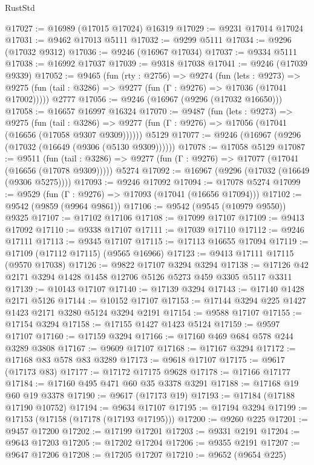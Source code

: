 \begin{lexlean}{RustStd}
\begin{coremodule}
{\begin{coremodule}
{{{{{{{{{{{{{{{{{{{{{{{{{{{{{{{{{@17027 := @16989 (@17015 @17024) @16319
@17029 := @9231 @17014 @17024
@17031 := @9462 @17013 @5111
@17032 := @9299 @5111
@17034 := @9296 (@17032 @9312)
@17036 := @9246 (@16967 @17034)
@17037 := @9334 @5111
@17038 := @16992 @17037
@17039 := @9318 @17038
@17041 := @9246 (@17039 @9339)
@17052 := @9465
    (fun (rty : @2756) =>
    @9274
      (fun (lets : @9273) =>
      @9275 (fun (tail : @3286) => @9277 (fun (Γ : @9276) => @17036 (@17041 @17002)))))
    @2777
@17056 := @9246 (@16967 (@9296 (@17032 @16650)))
@17058 := @16657 @16997 @16324
@17070 := @9487
    (fun (lets : @9273) =>
    @9275
      (fun (tail : @3286) =>
      @9277 (fun (Γ : @9276) => @17056 (@17041 (@16656 (@17058 @9307 @9309))))))
    @5129
@17077 := @9246 (@16967 (@9296 (@17032 (@16649 (@9306 (@5130 @9309))))))
@17078 := @17058 @5129
@17087 := @9511
    (fun (tail : @3286) => @9277 (fun (Γ : @9276) => @17077 (@17041 (@16656 (@17078 @9309)))))
    @5274
@17092 := @16967 (@9296 (@17032 (@16649 (@9306 @5275))))
@17093 := @9246 @17092
@17094 := @17078 @5274
@17099 := @9529 (fun (Γ : @9276) => @17093 (@17041 (@16656 @17094)))
@17102 := @9542 (@9859 (@9964 @9861))
@17106 := @9542 (@9545 (@10979 @9550)) @9325
@17107 := @17102 @17106
@17108 := @17099 @17107
@17109 := @9413 @17092
@17110 := @9338 @17107
@17111 := @17039 @17110
@17112 := @9246 @17111
@17113 := @9345 @17107
@17115 := @17113 @16655 @17094
@17119 := @17109 (@17112 @17115) (@9565 @16966)
@17123 := @9413 @17111 @17115 (@9570 @17038)
@17126 := @9822 @17107 @3294 @3294
@17138 := @17126 @42 @2171 @3294 @1428 @1458 @12706 @5126 @5273 @459 @3305 @5117 @3311
@17139 := @10143 @17107
@17140 := @17139 @3294
@17143 := @17140 @1428 @2171 @5126
@17144 := @10152 @17107
@17153 := @17144 @3294 @225 @1427 @1423 @2171 @3280 @5124 @3294 @2191
@17154 := @9588 @17107
@17155 := @17154 @3294
@17158 := @17155 @1427 @1423 @5124
@17159 := @9597 @17107
@17160 := @17159 @3294
@17166 := @17160 @469 @684 @578 @244 @3289 @3808
@17167 := @9609 @17107
@17168 := @17167 @3294
@17172 := @17168 @83 @578 @83 @3289
@17173 := @9618 @17107
@17175 := @9617 (@17173 @83)
@17177 := @17172 @17175 @9628
@17178 := @17166 @17177
@17184 := @17160 @495 @471 @60 @35 @3378 @3291
@17188 := @17168 @19 @60 @19 @3378
@17190 := @9617 (@17173 @19)
@17193 := @17184 (@17188 @17190 @10752)
@17194 := @9634 @17107
@17195 := @17194 @3294
@17199 := @17153 (@17158 (@17178 (@17193 @17195)))
@17200 := @9260 @225
@17201 := @9457 @17200
@17202 := @17199 @17201
@17203 := @9331 @2191
@17204 := @9643 @17203
@17205 := @17202 @17204
@17206 := @9355 @2191
@17207 := @9647 @17206
@17208 := @17205 @17207
@17210 := @9652 (@9654 @225)
}}}}}}}}}}}}}}}}}}}}}}}}}}}}}}}}}
\end{coremodule}}
\end{coremodule}
\end{lexlean}
